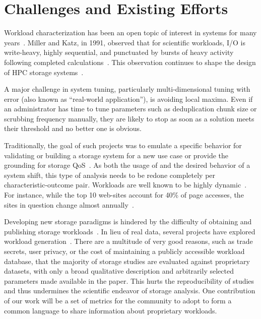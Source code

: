 \section{Challenges and Existing Efforts}%
\label{sec:challenges}

Workload characterization has been an open topic of interest in systems for many
years~\cite{ganger1995generating,wang2004storage,tarasov2012extracting}.  Miller
and Katz, in 1991, observed that for scientific workloads, I/O is write-heavy,
highly sequential, and punctuated by bursts of heavy activity following
completed calculations~\cite{millersc91,gunaskaramcaches11,rothpdsw07}.  This
observation continues to shape the design of HPC storage
systems~\cite{gunaskaramcaches11}.

A major challenge in system tuning, particularly multi-dimensional tuning with
error (also known as ``real-world application''), is avoiding local maxima.
Even if an administrator has time to tune parameters such as deduplication chunk
size or scrubbing frequency manually, they are likely to stop as soon as a
solution meets their threshold and no better one is obvious.%

Traditionally, the goal of such
projects was to emulate a specific behavior for validating or building a
storage system for a new use case or provide the grounding for storage
QoS~\cite{mesnier05}.  As both the usage of and the desired behavior of a system
shift, this type of analysis needs to be redone completely per
characteristic-outcome pair.  Workloads are well known to be highly
dynamic~\cite{uttamchandani2005chameleon}.  For instance, while the top 10 web-sites account for
40\% of page accesses, the sites in question change almost
annually~\cite{avani-systor}.

Developing new storage paradigms is hindered by the difficulty of obtaining and
publishing storage workloads~\cite{ian-tos}. In lieu of real data, several projects
have explored workload
generation~\cite{tarasov2012extracting,ganger1995generating,kurmas2003synthesizing,gomez2000new}.
There are a multitude of very good reasons, such as trade secrets, user
privacy, or the cost of maintaining a publicly accessible workload database,
that the majority of storage studies are evaluated against proprietary
datasets, with only a broad qualitative description and arbitrarily selected parameters made
available in the paper. This hurts the reproducibility of
studies and thus undermines the scientific endeavor of storage analysis.  One
contribution of our work will be a set of metrics for the community to adopt to
form a common language to share information about proprietary workloads.%

